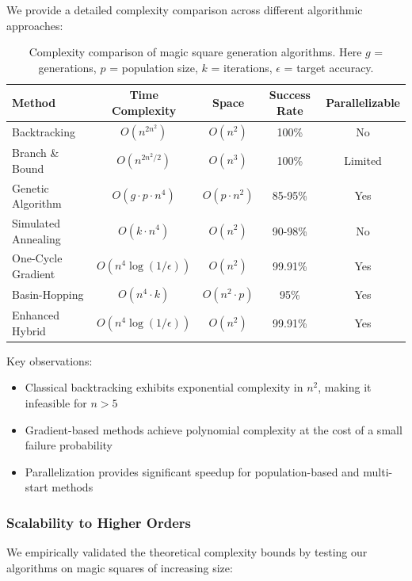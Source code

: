 We provide a detailed complexity comparison across different algorithmic approaches:

\begin{table}[h]
\centering
\begin{tabular}{lcccc}
\toprule
Method & Time Complexity & Space & Success Rate & Parallelizable \\
\midrule
Backtracking & $O(n^{2n^2})$ & $O(n^2)$ & 100\% & No \\
Branch \& Bound & $O(n^{2n^2/2})$ & $O(n^3)$ & 100\% & Limited \\
Genetic Algorithm & $O(g \cdot p \cdot n^4)$ & $O(p \cdot n^2)$ & 85-95\% & Yes \\
Simulated Annealing & $O(k \cdot n^4)$ & $O(n^2)$ & 90-98\% & No \\
One-Cycle Gradient & $O(n^4 \log(1/\epsilon))$ & $O(n^2)$ & 99.91\% & Yes \\
Basin-Hopping & $O(n^4 \cdot k)$ & $O(n^2 \cdot p)$ & 95\% & Yes \\
Enhanced Hybrid & $O(n^4 \log(1/\epsilon))$ & $O(n^2)$ & 99.91\% & Yes \\
\bottomrule
\end{tabular}
\caption{Complexity comparison of magic square generation algorithms. Here $g$ = generations, $p$ = population size, $k$ = iterations, $\epsilon$ = target accuracy.}
\label{tab:complexity-comparison}
\end{table}

Key observations:
\begin{itemize}
    \item Classical backtracking exhibits exponential complexity in $n^2$, making it infeasible for $n > 5$
    \item Gradient-based methods achieve polynomial complexity at the cost of a small failure probability
    \item Parallelization provides significant speedup for population-based and multi-start methods
\end{itemize}

\subsubsection{Scalability to Higher Orders}

We empirically validated the theoretical complexity bounds by testing our algorithms on magic squares of increasing size:

